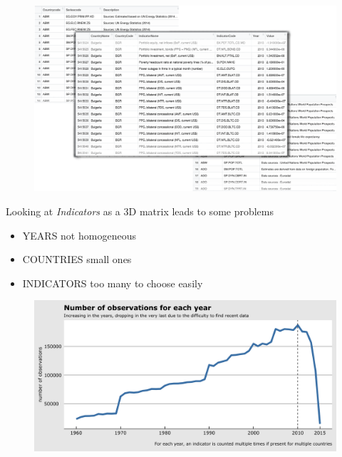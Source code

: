 \documentclass[10pt]{beamer}
\begin{document}
\begin{frame}
	\begin{figure}
		\centering
		\includegraphics[width=\textwidth]{tables_2.png}
	\end{figure}
\end{frame}

\begin{frame}
	Looking at \textit{Indicators} as a 3D matrix leads to some problems
	\begin{itemize}
		\item YEARS  not homogeneous
		\item COUNTRIES  small ones
		\item INDICATORS  too many to choose easily
	\end{itemize}
\end{frame}

\begin{frame}
	\begin{figure}
		\centering
		\includegraphics[width=\textwidth]{plot0001.png}
	\end{figure}
\end{frame}
\end{document}
